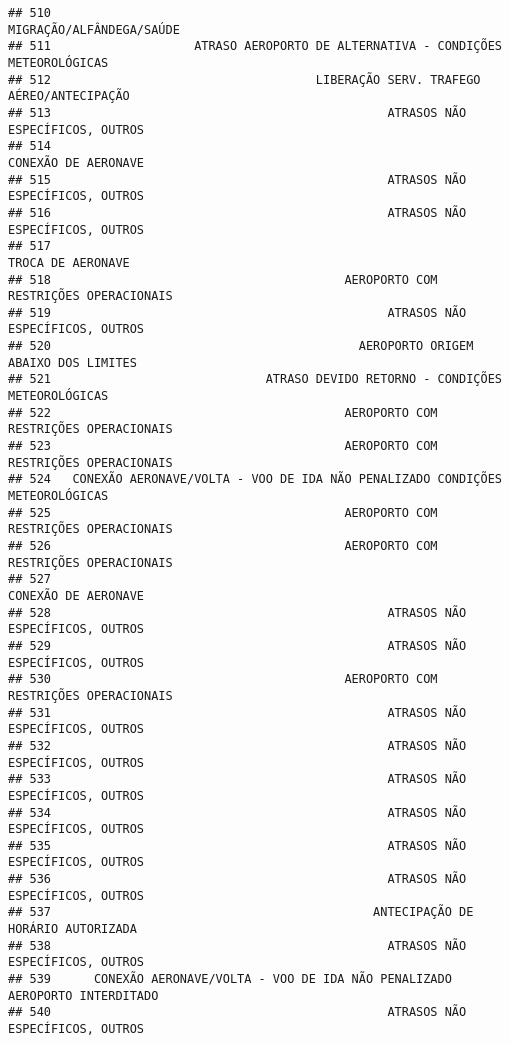 \documentclass[
]{article}
\begin{document}
\begin{verbatim}
## 510                                                      MIGRAÇÃO/ALFÂNDEGA/SAÚDE
## 511                    ATRASO AEROPORTO DE ALTERNATIVA - CONDIÇÕES METEOROLÓGICAS
## 512                                     LIBERAÇÃO SERV. TRAFEGO AÉREO/ANTECIPAÇÃO
## 513                                               ATRASOS NÃO ESPECÍFICOS, OUTROS
## 514                                                           CONEXÃO DE AERONAVE
## 515                                               ATRASOS NÃO ESPECÍFICOS, OUTROS
## 516                                               ATRASOS NÃO ESPECÍFICOS, OUTROS
## 517                                                             TROCA DE AERONAVE
## 518                                         AEROPORTO COM RESTRIÇÕES OPERACIONAIS
## 519                                               ATRASOS NÃO ESPECÍFICOS, OUTROS
## 520                                           AEROPORTO ORIGEM ABAIXO DOS LIMITES
## 521                              ATRASO DEVIDO RETORNO - CONDIÇÕES METEOROLÓGICAS
## 522                                         AEROPORTO COM RESTRIÇÕES OPERACIONAIS
## 523                                         AEROPORTO COM RESTRIÇÕES OPERACIONAIS
## 524   CONEXÃO AERONAVE/VOLTA - VOO DE IDA NÃO PENALIZADO CONDIÇÕES METEOROLÓGICAS
## 525                                         AEROPORTO COM RESTRIÇÕES OPERACIONAIS
## 526                                         AEROPORTO COM RESTRIÇÕES OPERACIONAIS
## 527                                                           CONEXÃO DE AERONAVE
## 528                                               ATRASOS NÃO ESPECÍFICOS, OUTROS
## 529                                               ATRASOS NÃO ESPECÍFICOS, OUTROS
## 530                                         AEROPORTO COM RESTRIÇÕES OPERACIONAIS
## 531                                               ATRASOS NÃO ESPECÍFICOS, OUTROS
## 532                                               ATRASOS NÃO ESPECÍFICOS, OUTROS
## 533                                               ATRASOS NÃO ESPECÍFICOS, OUTROS
## 534                                               ATRASOS NÃO ESPECÍFICOS, OUTROS
## 535                                               ATRASOS NÃO ESPECÍFICOS, OUTROS
## 536                                               ATRASOS NÃO ESPECÍFICOS, OUTROS
## 537                                             ANTECIPAÇÃO DE HORÁRIO AUTORIZADA
## 538                                               ATRASOS NÃO ESPECÍFICOS, OUTROS
## 539      CONEXÃO AERONAVE/VOLTA - VOO DE IDA NÃO PENALIZADO AEROPORTO INTERDITADO
## 540                                               ATRASOS NÃO ESPECÍFICOS, OUTROS

\end{verbatim}
\end{document}
